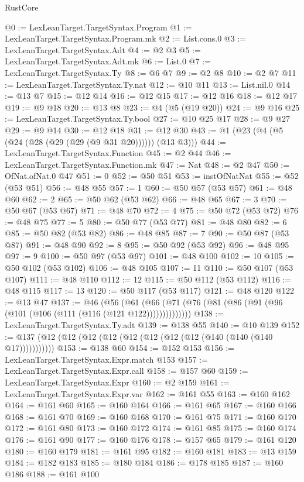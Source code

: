 \begin{lexlean}{RustCore}
\begin{coremodule}
@0 := LexLeanTarget.TargetSyntax.Program
@1 := LexLeanTarget.TargetSyntax.Program.mk
@2 := List.cons.{0}
@3 := LexLeanTarget.TargetSyntax.Adt
@4 := @2 @3
@5 := LexLeanTarget.TargetSyntax.Adt.mk
@6 := List.{0}
@7 := LexLeanTarget.TargetSyntax.Ty
@8 := @6 @7
@9 := @2 @8
@10 := @2 @7
@11 := LexLeanTarget.TargetSyntax.Ty.nat
@12 := @10 @11
@13 := List.nil.{0}
@14 := @13 @7
@15 := @12 @14
@16 := @12 @15
@17 := @12 @16
@18 := @12 @17
@19 := @9 @18
@20 := @13 @8
@23 := @4 (@5 (@19 @20))
@24 := @9 @16
@25 := LexLeanTarget.TargetSyntax.Ty.bool
@27 := @10 @25 @17
@28 := @9 @27
@29 := @9 @14
@30 := @12 @18
@31 := @12 @30
@43 := @1 (@23 (@4 (@5 (@24 (@28 (@29 (@29 (@9 @31 @20)))))) (@13 @3)))
@44 := LexLeanTarget.TargetSyntax.Function
@45 := @2 @44
@46 := LexLeanTarget.TargetSyntax.Function.mk
@47 := Nat
@48 := @2 @47
@50 := OfNat.ofNat.{0} @47
@51 := 0
@52 := @50 @51
@53 := instOfNatNat
@55 := @52 (@53 @51)
@56 := @48 @55
@57 := 1
@60 := @50 @57 (@53 @57)
@61 := @48 @60
@62 := 2
@65 := @50 @62 (@53 @62)
@66 := @48 @65
@67 := 3
@70 := @50 @67 (@53 @67)
@71 := @48 @70
@72 := 4
@75 := @50 @72 (@53 @72)
@76 := @48 @75
@77 := 5
@80 := @50 @77 (@53 @77)
@81 := @48 @80
@82 := 6
@85 := @50 @82 (@53 @82)
@86 := @48 @85
@87 := 7
@90 := @50 @87 (@53 @87)
@91 := @48 @90
@92 := 8
@95 := @50 @92 (@53 @92)
@96 := @48 @95
@97 := 9
@100 := @50 @97 (@53 @97)
@101 := @48 @100
@102 := 10
@105 := @50 @102 (@53 @102)
@106 := @48 @105
@107 := 11
@110 := @50 @107 (@53 @107)
@111 := @48 @110
@112 := 12
@115 := @50 @112 (@53 @112)
@116 := @48 @115
@117 := 13
@120 := @50 @117 (@53 @117)
@121 := @48 @120
@122 := @13 @47
@137 := @46
    (@56 (@61 (@66 (@71 (@76 (@81 (@86 (@91 (@96 (@101 (@106 (@111 (@116 (@121 @122))))))))))))))
@138 := LexLeanTarget.TargetSyntax.Ty.adt
@139 := @138 @55
@140 := @10 @139
@152 := @137 (@12 (@12 (@12 (@12 (@12 (@12 (@12 (@12 (@140 (@140 (@140 @17)))))))))))
@153 := @138 @60
@154 := @152 @153
@156 := LexLeanTarget.TargetSyntax.Expr.match @153
@157 := LexLeanTarget.TargetSyntax.Expr.call
@158 := @157 @60
@159 := LexLeanTarget.TargetSyntax.Expr
@160 := @2 @159
@161 := LexLeanTarget.TargetSyntax.Expr.var
@162 := @161 @55
@163 := @160 @162
@164 := @161 @60
@165 := @160 @164
@166 := @161 @65
@167 := @160 @166
@168 := @161 @70
@169 := @160 @168
@170 := @161 @75
@171 := @160 @170
@172 := @161 @80
@173 := @160 @172
@174 := @161 @85
@175 := @160 @174
@176 := @161 @90
@177 := @160 @176
@178 := @157 @65
@179 := @161 @120
@180 := @160 @179
@181 := @161 @95
@182 := @160 @181
@183 := @13 @159
@184 := @182 @183
@185 := @180 @184
@186 := @178 @185
@187 := @160 @186
@188 := @161 @100

\end{coremodule}
\end{lexlean}
